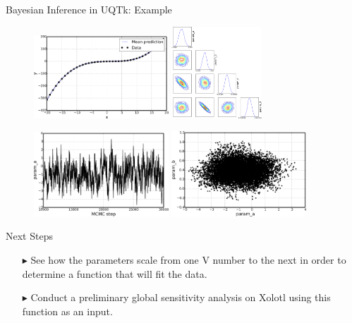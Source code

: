 \documentclass[10pt]{beamer}
\begin{document}
\begin{frame}{Bayesian Inference in UQTk: Example}
     \begin{figure}
         \includegraphics[width=0.45\textwidth]{result}
         \hspace{0.5in}
         \includegraphics[width=0.3\textwidth]{posteriorSummary}
         \hspace{0.4in}
     \end{figure}
     \begin{figure}
         \includegraphics[width=0.45\textwidth]{chainExample}
         \hspace{0.1in}
         \includegraphics[width=0.45\textwidth]{chain2DExample}
     \end{figure}
\end{frame}

\begin{frame}{Next Steps}
	\Large
    \begin{itemize}
    	\item[$\blacktriangleright$] See how the parameters scale from one V number
    	to the next in order to determine a function that will fit the data.
    	\newline
    	
    	\item[$\blacktriangleright$] Conduct a preliminary global sensitivity
    	analysis on Xolotl using this function as an input.
    \end{itemize}
\end{frame}
\end{document}
